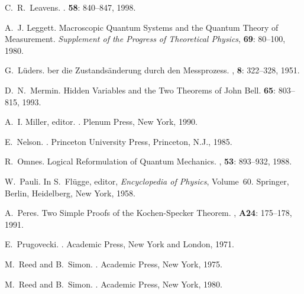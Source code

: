 \documentclass[12pt]{article}
\begin{document}
\begin{thebibliography}{10}
 C.~R.~Leavens. .  {\bf 58}:
   840--847, 1998.

 A.~J. Leggett.  \newblock Macroscopic {Q}uantum
   {S}ystems and the {Q}uantum {T}heory of {M}easurement.  \newblock
   {\em Supplement of the Progress of Theoretical Physics}, {\bf 69}:
   80--100, 1980.

 G.~L{\" u}ders.  ber die
   Zustands{\"a}nderung durch den {M}essprozess.  , {\bf 8}: 322--328, 1951.

 D.~N.~Mermin.  \newblock Hidden Variables and the Two
   Theorems of John Bell.  
   {\bf 65}: 803--815, 1993.

 A.~I. Miller, editor.  .  \newblock Plenum Press, New York, 1990.

 E.~Nelson.  .
   \newblock Princeton University Press, Princeton, N.J., 1985.

 R.~Omnes.  \newblock Logical {R}eformulation of
   {Q}uantum {M}echanics.  , {\bf 53}: 893--932, 1988.

 W.~Pauli.  \newblock In S.~Fl{\"u}gge, editor, {\em
     Encyclopedia of Physics}, Volume~60.  Springer, Berlin,
   Heidelberg, New York, 1958.

 A.~Peres.  \newblock Two {S}imple {P}roofs of the
   {K}ochen-{S}pecker {T}heorem.  ,
   {\bf A24}: 175--178, 1991.

 E.~Prugovecki.  .  \newblock Academic Press, New York and
   London, 1971.

 M.~Reed and B.~Simon.  .  \newblock Academic
   Press, New York, 1975.

 M.~Reed and B.~Simon.  .  \newblock Academic Press, New
   York, 1980.


\end{thebibliography}
\end{document}
